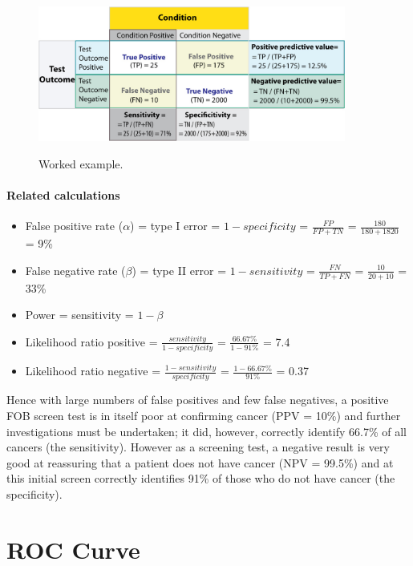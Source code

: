 \begin{figure}[ht]
  \centering
  \includegraphics[width=0.9\textwidth]{../Images/Sensitivity_Specificity_Example.jpg}\\
  \caption{Worked example.}\label{fig:sens_spec_example}
\end{figure}

\paragraph{Related calculations}

\begin{itemize}
  \item False positive rate ($\alpha$) = type I error = $1 - specificity$ = $\frac{FP}{FP + TN}$ = $\frac{180}{180+1820}$ = 9\%
  \item False negative rate ($\beta$) = type II error = $1 - sensitivity$ = $\frac{FN}{TP + FN}$ = $\frac{10}{20+10}$ = 33\%
  \item Power = sensitivity = $1 - \beta$
  \item Likelihood ratio positive = $\frac{sensitivity}{1−specificity}$ = $\frac{66.67\%}{1−91\%}$ = 7.4
  \item Likelihood ratio negative = $\frac{1−sensitivity}{specificity}$ = $\frac{1−66.67\%}{91\%}$ = 0.37
\end{itemize}

Hence with large numbers of false positives and few false negatives, a positive FOB screen test is in itself poor at confirming cancer (PPV = 10\%) and further investigations must be undertaken; it did, however, correctly identify 66.7\% of all cancers (the sensitivity). However as a screening test, a negative result is very good at reassuring that a patient does not have cancer (NPV = 99.5\%) and at this initial screen correctly identifies 91\% of those who do not have cancer (the specificity).

\section{ROC Curve}

